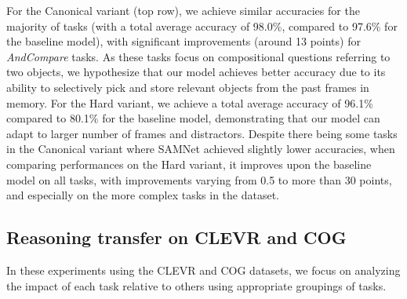 For the Canonical variant (top row), we achieve similar accuracies for the majority of tasks (with a total average accuracy of 98.0\%, 
compared to 97.6\% for the baseline model), with significant improvements (around 13 points) for \textit{AndCompare} tasks.
As these tasks focus on compositional questions referring to two objects, we hypothesize that our model achieves better 
accuracy due to its ability to selectively pick and store relevant objects from the past frames in memory.
For the Hard variant, we achieve a total average accuracy of 96.1\% compared to 80.1\% for the baseline model, demonstrating
that our model can adapt to larger number of frames and distractors.
Despite there being some tasks in the Canonical variant where SAMNet achieved slightly lower accuracies,
when comparing performances on the Hard variant, it improves upon the baseline model on all tasks, 
with improvements varying from 0.5 to more than 30 points, and especially on the more complex tasks in the dataset.

\subsection{Reasoning transfer on CLEVR and COG}
\label{sec:reasoning}
In these experiments using the CLEVR and COG datasets, we focus on analyzing the impact 
of each task relative to others using appropriate groupings of tasks.

